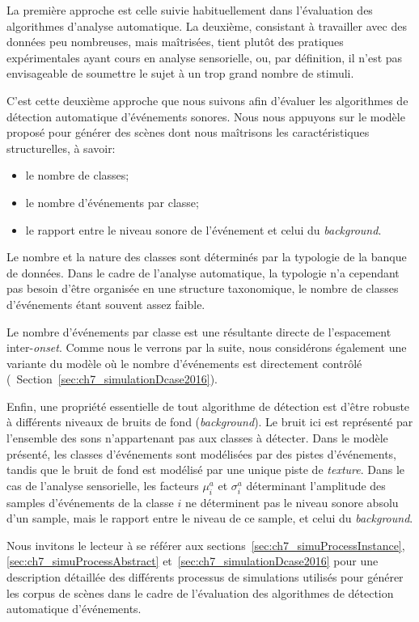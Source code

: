La première approche est celle suivie habituellement dans l'évaluation des algorithmes d'analyse automatique. La deuxième, consistant à travailler avec des données peu nombreuses, mais maîtrisées, tient plutôt des pratiques expérimentales ayant cours en analyse sensorielle, ou, par définition, il n'est pas envisageable de soumettre le sujet à un trop grand nombre de stimuli.

C'est cette deuxième approche que nous suivons afin d'évaluer les algorithmes de détection automatique d'événements sonores. Nous nous appuyons sur le modèle proposé pour générer des scènes dont nous maîtrisons les caractéristiques structurelles, à savoir:

\begin{itemize}
\item le nombre de classes;
\item le nombre d'événements par classe;
\item le rapport entre le niveau sonore de l'événement et celui du \emph{background}. 
\end{itemize}

Le nombre et la nature des classes sont déterminés par la typologie de la banque de données. Dans le cadre de l'analyse automatique, la typologie n'a cependant pas besoin d'être organisée en une structure taxonomique, le nombre de classes d'événements étant souvent assez faible.

Le nombre d'événements par classe est une résultante directe de l'espacement inter-\emph{onset}. Comme nous le verrons par la suite, nous considérons également une variante du modèle où le nombre d'événements est directement contrôlé (\cf~Section~\ref{sec:ch7_simulationDcase2016}).

Enfin, une propriété essentielle de tout algorithme de détection est d'être robuste à différents niveaux de bruits de fond (\emph{background}). Le bruit ici est représenté par l'ensemble des sons n'appartenant pas aux classes à détecter. Dans le modèle présenté, les classes d'événements sont modélisées par des pistes d'événements, tandis que le bruit de fond est modélisé par une unique piste de \emph{texture}. Dans le cas de l'analyse sensorielle, les facteurs $\mu^a_i$ et $\sigma^a_i$ déterminant l'amplitude des samples d'événements de la classe $i$ ne déterminent pas le niveau sonore absolu d'un sample, mais le rapport entre le niveau de ce sample, et celui du \emph{background}.

Nous invitons le lecteur à se référer aux sections~\ref{sec:ch7_simuProcessInstance}, \ref{sec:ch7_simuProcessAbstract} et~\ref{sec:ch7_simulationDcase2016} pour une description détaillée des différents processus de simulations utilisés pour générer les corpus de scènes dans le cadre de l'évaluation des algorithmes de détection automatique d'événements.

